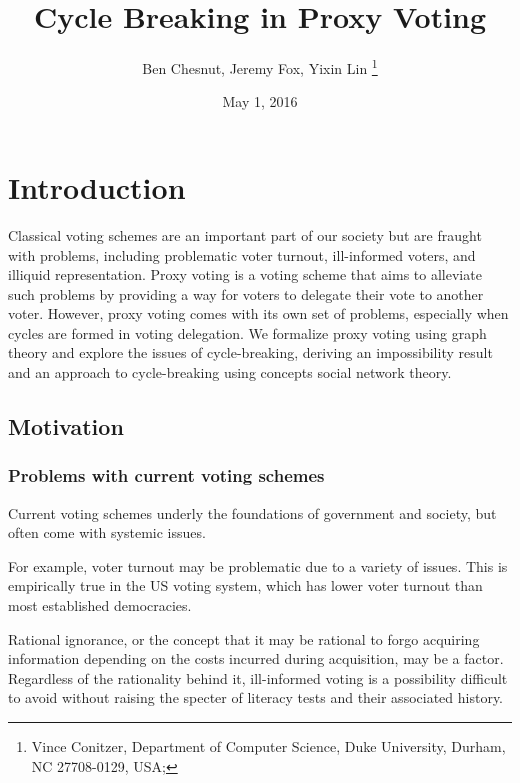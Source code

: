 \documentclass[10pt]{article}
\theoremstyle{definition}
\begin{document}
  
\title{Cycle Breaking in Proxy Voting
}
\date{May 1, 2016}

\author{
Ben Chesnut, Jeremy Fox, Yixin Lin \thanks{%
Vince Conitzer, Department of Computer Science, Duke University, Durham, NC
27708-0129, USA;}}

\maketitle

\section{Introduction}

Classical voting schemes are an important part of our society but are fraught with problems, including problematic voter turnout, ill-informed voters, and illiquid representation. Proxy voting is a voting scheme that aims to alleviate such problems by providing a way for voters to delegate their vote to another voter. However, proxy voting comes with its own set of problems, especially when cycles are formed in voting delegation. We formalize proxy voting using graph theory and explore the issues of cycle-breaking, deriving an impossibility result and an approach to cycle-breaking using concepts social network theory.

\subsection{Motivation}

\subsubsection{Problems with current voting schemes}

Current voting schemes underly the foundations of government and society, but often come with systemic issues. 

For example, voter turnout may be problematic due to a variety of issues. This is empirically true in the US voting system\cite{turnout}, which has lower voter turnout than most established democracies. 

Rational ignorance\cite{rationalIgnorance}, or the concept that it may be rational to forgo acquiring information depending on the costs incurred during acquisition, may be a factor. Regardless of the rationality behind it, ill-informed voting is a possibility difficult to avoid without raising the specter of literacy tests and their associated history.
\end{document}
